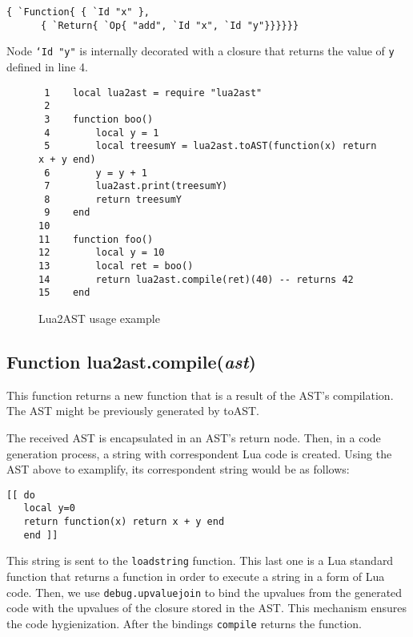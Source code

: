\documentclass[english]{llncs}
\begin{document}
\begin{verbatim}
{ `Function{ { `Id "x" },
      { `Return{ `Op{ "add", `Id "x", `Id "y"}}}}}}
\end{verbatim}

Node \texttt{`Id "y"} is internally decorated with a closure that returns the value of \texttt{y} defined in line 4.

\begin{figure}[t]
\begin{verbatim}
 1    local lua2ast = require "lua2ast"
 2    
 3    function boo()
 4        local y = 1
 5        local treesumY = lua2ast.toAST(function(x) return x + y end)
 6        y = y + 1
 7        lua2ast.print(treesumY)
 8        return treesumY
 9    end
10    
11    function foo()	
12        local y = 10
13        local ret = boo()
14        return lua2ast.compile(ret)(40) -- returns 42
15    end
\end{verbatim}
\protect\caption{\label{fig:Lua2ASTExample}Lua2AST usage example}
\end{figure}

\subsection{Function lua2ast.compile(\emph{ast})}

This function returns a new function that is a result of the AST's compilation. 
The AST might be previously generated by toAST.


The received AST is encapsulated in an AST's return node.
Then, in a code generation process, a string with correspondent Lua code is created.
Using the AST above to examplify, its correspondent string would be as follows:

\begin{verbatim}
[[ do 
   local y=0 
   return function(x) return x + y end 
   end ]]
\end{verbatim}

This string is sent to the \texttt{loadstring} function.
This last one is a Lua standard function that returns a function in order to execute a string in a form of Lua code.
Then, we use \texttt{debug.upvaluejoin} to bind the upvalues from the generated code with the upvalues of the closure stored in the AST.
This mechanism ensures the code hygienization.
After the bindings \texttt{compile} returns the function.
\end{document}
